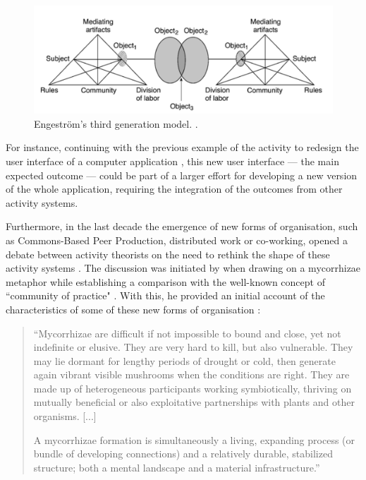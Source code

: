 \begin{figure}[H]
	\centering
	\includegraphics[width=\textwidth]{img/engestrom_shared.png}
	\caption[Engestr{\"o}m's third generation model]%
	{Engestr{\"o}m's third generation model. \textcite[136]{engestrom2001}.}
	\label{engestrom-diagram-third-gen-a}
\end{figure}

For instance, continuing with the previous example of the activity to redesign the user interface of a computer application \parencite{kaptelinin2012}, this new user interface --- the main expected outcome --- could be part of a larger effort for developing a new version of the whole application, requiring the integration of the outcomes from other activity systems.

Furthermore, in the last decade the emergence of new forms of organisation, such as Commons-Based Peer Production, distributed work or co-working, opened a debate between activity theorists on the need to rethink the shape of these activity systems \parencite{engestrom_future_2009}. The discussion was initiated by \textcite{engestrom-myco} when drawing on a mycorrhizae metaphor while establishing a comparison with the well-known concept of ``community of practice"  \parencite{wenger1998communities}. With this, he provided an initial account of the characteristics of some of these new forms of organisation \parencite[51-52]{engestrom-myco}:

\begin{quotation}
 ``Mycorrhizae are difficult if not impossible to bound and close, yet not
indefinite or elusive. They are very hard to kill, but also vulnerable.
They may lie dormant for lengthy periods of drought or cold, then
generate again vibrant visible mushrooms when the conditions are
right. They are made up of heterogeneous participants working
symbiotically, thriving on mutually beneficial or also exploitative
partnerships with plants and other organisms. [...]

A mycorrhizae formation is simultaneously a living, expanding
process (or bundle of developing connections) and a relatively
durable, stabilized structure; both a mental landscape and a material
infrastructure.''

\end{quotation}

